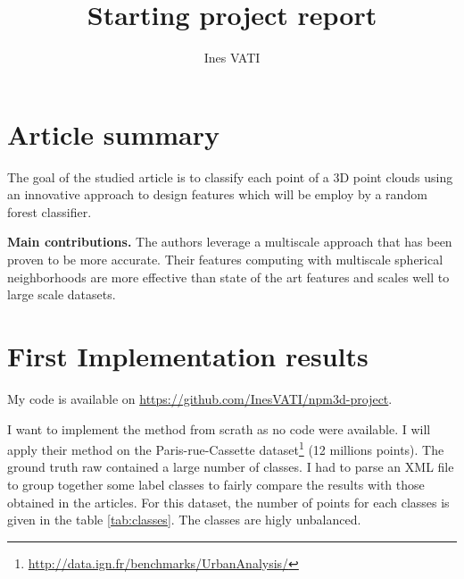 \documentclass[a4paper, 11pt]{article}
\title{Starting project report} %
\author[1, 2]{Ines VATI}
\date{}
\begin{document}
\maketitle
    

\section{Article summary}
The goal of the studied article \cite{thomas_semantic_2018} is to classify each point of a 3D point clouds using an innovative approach to design features which will be employ by a random forest classifier. 

\textbf{Main contributions. } The authors leverage a multiscale approach that has been proven to be more accurate. Their features computing with multiscale spherical neighborhoods are more effective than state of the art features and scales well to large scale datasets. 

\section{First Implementation results}
My code is available on \url{https://github.com/InesVATI/npm3d-project}.

I want to implement the method from scrath as no code were available. I will apply their method on the Paris-rue-Cassette dataset\footnote{\url{http://data.ign.fr/benchmarks/UrbanAnalysis/}} (12 millions points). The ground truth raw contained a large number of classes. I had to parse an XML file to group together some label classes to fairly compare the results with those obtained in the articles. For this dataset, the number of points for each classes is given in the table \ref{tab:classes}. The classes are higly unbalanced.
\end{document}
